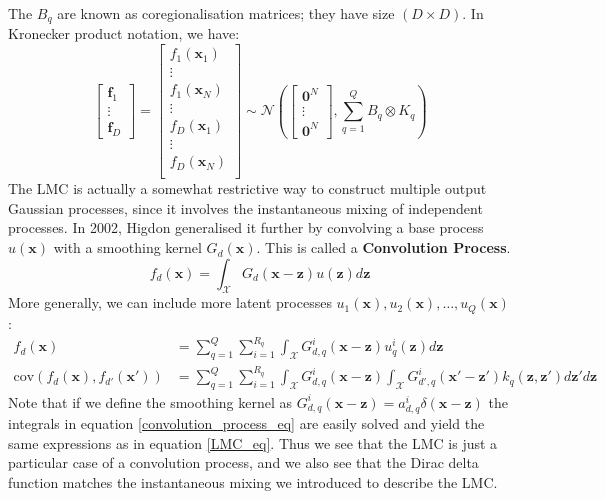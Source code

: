 \documentclass[a4paper,12pt]{article}
\begin{document}
The $B_q$ are known as coregionalisation matrices; they have size $(D \times D)$.
In Kronecker product notation, we have:
\begin{equation}
    \begin{bmatrix}
        \mathbf{f}_1\\
        \vdots\\
        \mathbf{f}_D
    \end{bmatrix} = 
    \begin{bmatrix}
        f_1(\mathbf{x}_1)\\
        \vdots \\
        f_1(\mathbf{x}_N)\\
        \vdots \\
        f_D(\mathbf{x}_1)\\
        \vdots \\
        f_D(\mathbf{x}_N)\\
    \end{bmatrix} \sim \mathcal{N}\left(
    \begin{bmatrix}
        \mathbf{0}^N\\
        \vdots \\
        \mathbf{0}^N
    \end{bmatrix}, \sum_{q = 1}^Q B_q \otimes K_q \right)
\end{equation}
\newline
The LMC is actually a somewhat restrictive way to construct multiple output Gaussian processes, since it involves the instantaneous mixing of independent processes. In 2002, Higdon \cite{Higdon2002} generalised it further by convolving a base process $u(\mathbf{x})$ with a smoothing kernel $G_d(\mathbf{x})$. This is called a \textbf{Convolution Process}.
\begin{equation}
    f_d(\mathbf{x}) = \int_\mathcal{X} G_d(\mathbf{x} - \mathbf{z}) u(\mathbf{z}) d\mathbf{z}
\end{equation}
More generally, we can include more latent processes $u_1(\mathbf{x}), u_2(\mathbf{x}), \dots, u_Q(\mathbf{x})$:
\begin{equation}
\label{convolution_process_eq}
\begin{aligned}
  f_d(\mathbf{x}) &= \sum_{q = 1}^{Q} \sum_{i = 1}^{R_q} \int_\mathcal{X} G^i_{d,q}(\mathbf{x} - \mathbf{z}) u^i_q(\mathbf{z}) d\mathbf{z} \\
  \text{cov}(f_d(\mathbf{x}), f_{d'}(\mathbf{x'})) &= \sum_{q = 1}^Q \sum_{i = 1}^{R_q} \int_\mathcal{X} G^i_{d,q}(\mathbf{x} - \mathbf{z}) \int_\mathcal{X} G^i_{d',q}(\mathbf{x'} - \mathbf{z'}) k_q(\mathbf{z}, \mathbf{z'}) d\mathbf{z'} d\mathbf{z}
\end{aligned}
\end{equation}
Note that if we define the smoothing kernel as $G^i_{d,q}(\mathbf{x} - \mathbf{z}) = a^i_{d,q} \delta(\mathbf{x} - \mathbf{z})$ the integrals in equation \ref{convolution_process_eq} are easily solved and yield the same expressions as in equation \ref{LMC_eq}. Thus we see that the LMC is just a particular case of a convolution process, and we also see that the Dirac delta function matches the instantaneous mixing we introduced to describe the LMC.
\end{document}
